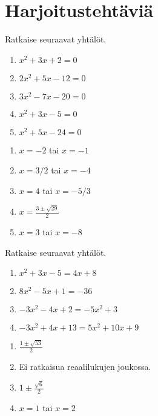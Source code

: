 \section{Harjoitustehtäviä}
\begin{tehtava}
    Ratkaise seuraavat yhtälöt.
    \begin{enumerate}
        \item $x^2+3x+2=0$
        \item $2x^2+5x-12=0$
        \item $3x^2-7x-20=0$
        \item $x^2+3x-5=0$
        \item $x^2+5x-24=0$
    \end{enumerate}
    \begin{vastaus}
        \begin{enumerate}
            \item $x=-2$ tai $x=-1$
            \item $x=3/2$ tai $x=-4$
            \item $x=4$ tai $x=-5/3$
            \item $x=\frac{3\pm\sqrt{29}}{2}$
            \item $x=3$ tai $x=-8$
        \end{enumerate}
    \end{vastaus}
\end{tehtava}

\begin{tehtava}
    Ratkaise seuraavat yhtälöt.
    \begin{enumerate}
        \item $x^2+3x-5=4x+8$
        \item $8x^2-5x+1=-36$
        \item $-3x^2-4x+2=-5x^2+3$
        \item $-3x^2+4x+13=5x^2+10x+9$
    \end{enumerate}
    \begin{vastaus}
        \begin{enumerate}
            \item $\frac{1\pm\sqrt{53}}{2}$
            \item Ei ratkaisua reaalilukujen joukossa.
            \item $1\pm\frac{\sqrt{6}}{2}$
            \item $x=1$ tai $x=2$
        \end{enumerate}
    \end{vastaus}
\end{tehtava}